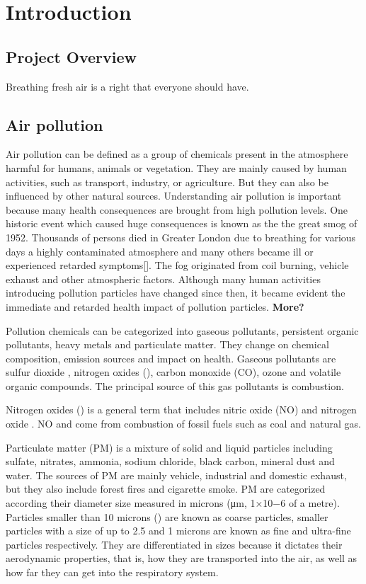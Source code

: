 \chapter{Introduction}

\section{Project Overview}
Breathing fresh air is a right that everyone should have.

\section{Air pollution}
Air pollution can be defined as a group of chemicals present in the atmosphere harmful for humans, animals or vegetation. They are mainly caused by human activities, such as transport, industry, or agriculture. But they can also be influenced by other natural sources. Understanding air pollution is important because many health consequences are brought from high pollution levels. One historic event which caused huge consequences is known as the the great smog of 1952. Thousands of persons died in Greater London due to  breathing for various days a highly contaminated atmosphere and many others became ill or experienced retarded symptoms[]. The fog originated from coil burning, vehicle exhaust and other atmospheric factors. Although many human activities introducing pollution particles have changed since then, it became evident the immediate and retarded health impact of pollution particles. \textbf{More?}

Pollution chemicals can be categorized into gaseous pollutants, persistent organic pollutants, heavy metals and particulate matter. They change on chemical composition, emission sources and impact on health. Gaseous pollutants are sulfur dioxide \SOTWO, nitrogen oxides (\NOX), carbon monoxide (CO), ozone \OTHREE and volatile organic compounds. The principal source of this gas pollutants is combustion. 

Nitrogen oxides (\NOX) is a general term that includes nitric oxide (NO) and nitrogen oxide \NOTWO. NO and \NOTWO come from combustion of fossil fuels such as coal and natural gas.

Particulate matter (PM) is a mixture of solid and liquid particles including sulfate, nitrates, ammonia, sodium chloride, black carbon, mineral dust and water. The sources of PM are mainly vehicle, industrial and domestic exhaust, but they also include forest fires and cigarette smoke. PM are categorized according their diameter size measured in microns (μm, 1×10−6 of a metre). Particles smaller than 10 microns (\PMTEN) are known as coarse particles, smaller particles with a size of up to 2.5  and 1 microns are known as fine and ultra-fine particles respectively. They are differentiated in sizes because it dictates their aerodynamic properties, that is, how they are transported into the air, as well as how far they can get into the respiratory system.


